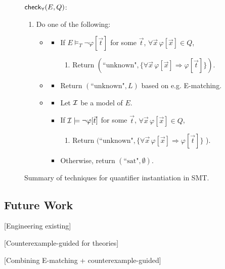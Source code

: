 \documentclass[oribibl]{llncs}
\begin{document}
\begin{figure}[t]
\begin{framed}
$\small\mathsf{check}_\forall( E, Q )$:
\begin{enumerate}
\item[\ ] Do one of the following:
\begin{itemize}
\item[{\bf (Conflicts)}]  
\begin{itemize}
\item[\ ] If $E \models_T \neg \varphi[ \vec t ]$ for some $\vec t$, $\forall \vec x\, \varphi[ \vec x ] \in Q$,
\begin{enumerate}
\item[\ ] Return $( \text{``unknown"}, \{ \forall \vec x\, \varphi[ \vec x ]  \Rightarrow \varphi[ \vec t ] \} )$.
\end{enumerate}
\end{itemize}
\item[{\bf(Heuristics)}]
\begin{itemize}
\item[\ ] Return $( \text{``unknown"}, L )$ based on e.g. E-matching.
\end{itemize}
\item[{\bf(Models)}]  
\begin{itemize}
\item[\ ] Let $\mathcal{I}$ be a model of $E$. 
\item[\ ] If $\mathcal{I} \models \neg \varphi[ \vec t ]$ for some $\vec t$, $\forall \vec x\, \varphi[ \vec x ] \in Q$,
\begin{enumerate}
\item[\ ] Return $( \text{``unknown"}, \{ \forall \vec x\, \varphi[ \vec x ]  \Rightarrow \varphi[ \vec t ] \}$ ).
\end{enumerate}
\item[\ ] Otherwise, return $( \text{``sat"}, \emptyset )$.
\end{itemize}
\end{itemize}
\end{enumerate}
\end{framed}
\vspace{-2ex}
\caption{Summary of techniques for quantifier instantiation in SMT.
\label{fig:smtqi}}
\end{figure}


\subsection{Future Work}

[Engineering existing]

[Counterexample-guided for theories]

[Combining E-matching + counterexample-guided]



\end{document}
